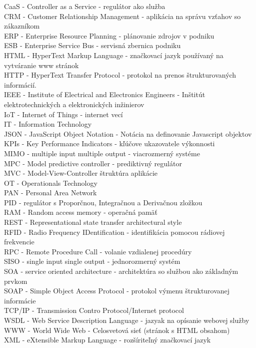 CaaS - Controller as a Service - regulátor ako služba \\
CRM - Customer Relationship Management - aplikácia na správu vzťahov so zákazníkom \\
ERP - Enterprise Resource Planning - plánovanie zdrojov v podniku \\
ESB - Enterprise Service Bus - servisná zbernica podniku \\
HTML - HyperText Markup Language - značkovací jazyk používaný na vytváranie www stránok \\
HTTP - HyperText Transfer Protocol - protokol na prenos štrukturovaných informácií. \\
IEEE - Institute of Electrical and Electronics Engineers - Inštitút elektrotechnických a elektronických inžinierov \\
IoT - Internet of Things - internet vecí \\
IT - Information Technology \\
JSON - JavaScript Object Notation - Notácia na definovanie Javascript objektov \\
KPIs - Key Performance Indicators - kľúčove ukazovatele výkonnosti \\
MIMO - multiple input multiple output - viacrozmerný systéme \\
MPC - Model predictive controller - prediktivný regulátor \\
MVC - Model-View-Controller štruktúra aplikácie \\
OT - Operationals Technology \\
PAN - Personal Area Network \\
PID - regulátor s Proporčnou, Integračnou a Derivačnou zložkou \\
RAM - Random access memory - operačná pamäť \\
REST - Representational state transfer architectural style \\
RFID - Radio Frequency IDentification - identifikácia pomocou rádiovej frekvencie \\
RPC - Remote Procedure Call - volanie vzdialenej procedúry \\
SISO - single input single output - jednorozmerný systém \\
SOA - service oriented architecture - architektúra so službou ako základným prvkom \\
SOAP - Simple Object Access Protocol - protokol výmenu štrukturovanej informácie \\
TCP/IP - Transmission Contro Protocol/Internet protocol \\ 
WSDL - Web Service Description Language - jazyak na opísanie webovej služby \\
WWW - World Wide Web - Celosvetová sieť (stránok s HTML obsahom) \\
XML - eXtensible Markup Language - rozšíriteľný značkovací jazyk
